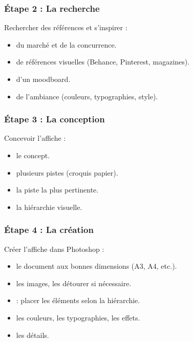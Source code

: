 \subsubsection{Étape 2 : La recherche}

Rechercher des références et s'inspirer :

\begin{itemize}
    \item {} du marché et de la concurrence.
    \item {} de références visuelles (Behance, Pinterest, magazines).
    \item {} d'un moodboard.
    \item {} de l'ambiance (couleurs, typographies, style).
\end{itemize}

\subsubsection{Étape 3 : La conception}

Concevoir l'affiche :

\begin{itemize}
    \item {} le concept.
    \item {} plusieurs pistes (croquis papier).
    \item {} la piste la plus pertinente.
    \item {} la hiérarchie visuelle.
\end{itemize}

\subsubsection{Étape 4 : La création}

Créer l'affiche dans Photoshop :

\begin{itemize}
    \item {} le document aux bonnes dimensions (A3, A4, etc.).
    \item {} les images, les détourer si nécessaire.
    \item {} : placer les éléments selon la hiérarchie.
    \item {} les couleurs, les typographies, les effets.
    \item {} les détails.
\end{itemize}

